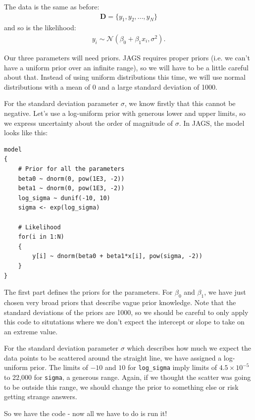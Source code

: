 The data is the same as before:
\begin{eqnarray}
\boldsymbol{D} = \{y_1, y_2, ..., y_N\}
\end{eqnarray}
and so is the likelihood:
\begin{eqnarray}
y_i \sim \mathcal{N}(\beta_0 + \beta_1 x_i, \sigma^2).
\end{eqnarray}

Our three parameters will need priors. JAGS requires proper priors (i.e. we
can't have a uniform prior over an infinite range), so we will have to be a
little careful about that. Instead of using uniform distributions this time,
we will use normal distributions with a mean of 0 and a large standard deviation
of 1000.

For the standard deviation parameter $\sigma$, we know firstly that this cannot
be negative. Let's use a log-uniform prior with generous lower and upper limits,
so we express uncertainty about the order of magnitude of $\sigma$.
In JAGS, the model looks like this:
\begin{framed}
\begin{verbatim}
model
{
    # Prior for all the parameters
    beta0 ~ dnorm(0, pow(1E3, -2))
    beta1 ~ dnorm(0, pow(1E3, -2))
    log_sigma ~ dunif(-10, 10)
    sigma <- exp(log_sigma)

    # Likelihood
    for(i in 1:N)
    {
        y[i] ~ dnorm(beta0 + beta1*x[i], pow(sigma, -2))
    }
}
\end{verbatim}
\end{framed}
The first part defines the priors for the parameters. For $\beta_0$ and $\beta_1$,
we have just chosen very broad priors that describe vague prior knowledge. Note
that the standard deviations of the priors are 1000, so we should be careful
to only apply this code to situtations where we don't expect the intercept or
slope to take on an extreme value.

For the standard deviation parameter $\sigma$ which describes how much we
expect the data points to be scattered around the straight line, we have assigned
a log-uniform prior. The limits of $-10$ and $10$ for {\tt log\_sigma} imply
limits of $4.5 \times 10^{-5}$ to 22,000 for {\tt sigma}, a generous range.
Again, if we thought the scatter
was going to be outside this range, we should change the prior to something
else or risk getting strange answers.

So we have the code - now all we have to do is run it!

